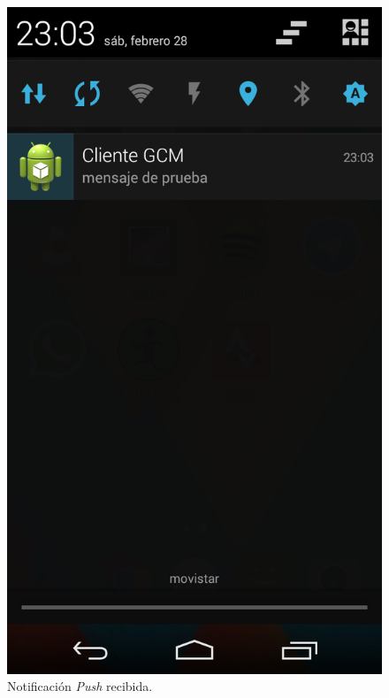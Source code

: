 \begin{figure}[H]
\centering
\includegraphics[scale=0.20]{images/capitulo5/notificacion.png}
\caption{Notificación \textit{Push} recibida.}
\label{notificacion}
\end{figure}

